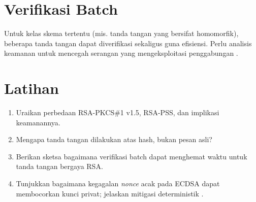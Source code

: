 \documentclass[../main.tex]{subfiles}
\begin{document}
\section{Verifikasi Batch}
Untuk kelas skema tertentu (mis. tanda tangan yang bersifat homomorfik), beberapa tanda tangan dapat diverifikasi sekaligus guna efisiensi. Perlu analisis keamanan untuk mencegah serangan yang mengeksploitasi penggabungan \citep{katzlindell}.

\section{Latihan}
\begin{enumerate}
  \item Uraikan perbedaan RSA-PKCS\#1 v1.5, RSA-PSS, dan implikasi keamanannya.
  \item Mengapa tanda tangan dilakukan atas hash, bukan pesan asli?
  \item Berikan sketsa bagaimana verifikasi batch dapat menghemat waktu untuk tanda tangan bergaya RSA.
  \item Tunjukkan bagaimana kegagalan \emph{nonce} acak pada ECDSA dapat membocorkan kunci privat; jelaskan mitigasi deterministik \citep{rfc6979}.
\end{enumerate}
\end{document}
